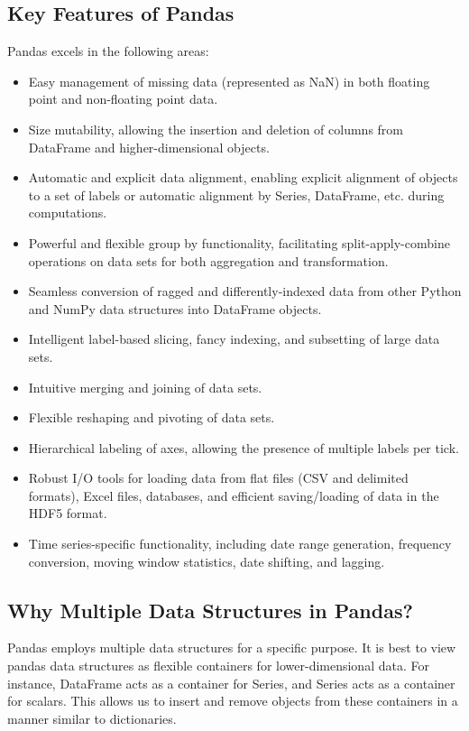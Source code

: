 \subsection{Key Features of Pandas}

Pandas excels in the following areas:

\begin{itemize}
	\item Easy management of missing data (represented as NaN) in both floating point and non-floating point data.
	\item Size mutability, allowing the insertion and deletion of columns from DataFrame and higher-dimensional objects.
	\item Automatic and explicit data alignment, enabling explicit alignment of objects to a set of labels or automatic alignment by Series, DataFrame, etc. during computations.
	\item Powerful and flexible group by functionality, facilitating split-apply-combine operations on data sets for both aggregation and transformation.
	\item Seamless conversion of ragged and differently-indexed data from other Python and NumPy data structures into DataFrame objects.
	\item Intelligent label-based slicing, fancy indexing, and subsetting of large data sets.
	\item Intuitive merging and joining of data sets.
	\item Flexible reshaping and pivoting of data sets.
	\item Hierarchical labeling of axes, allowing the presence of multiple labels per tick.
	\item Robust I/O tools for loading data from flat files (CSV and delimited formats), Excel files, databases, and efficient saving/loading of data in the HDF5 format.
	\item Time series-specific functionality, including date range generation, frequency conversion, moving window statistics, date shifting, and lagging.
\end{itemize}

\subsection{Why Multiple Data Structures in Pandas?}

Pandas employs multiple data structures for a specific purpose. It is best to view pandas data structures as flexible containers for lower-dimensional data. For instance, DataFrame acts as a container for Series, and Series acts as a container for scalars. This allows us to insert and remove objects from these containers in a manner similar to dictionaries.


